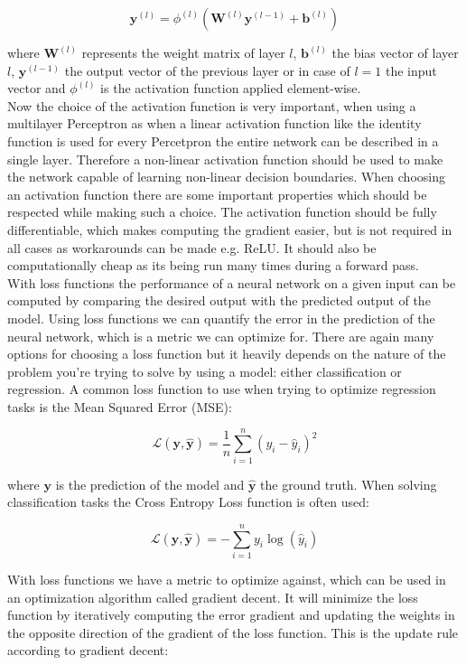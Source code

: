 \documentclass[twoside,a4paper,10pt,DIV=12,BCOR=12mm]{scrartcl}
\begin{document}
$$\mathbf{y}^{(l)} = \phi^{(l)}(\mathbf{W}^{(l)}\mathbf{y}^{(l-1)}+\mathbf{b}^{(l)})$$

where $\mathbf{W}^{(l)}$ represents the weight matrix of layer $l$, $\mathbf{b}^{(l)}$ the bias vector of layer $l$,
$\mathbf{y}^{(l-1)}$ the output vector of the previous layer or in case of $l=1$ the input vector
and $\phi^{(l)}$ is the activation function applied element-wise. \\


Now the choice of the activation function is very important, when using a multilayer Perceptron as when a linear activation function like the 
identity function is used for every Percetpron the entire network can be described in a single layer. Therefore
a non-linear activation function should be used to make the network capable of learning non-linear
decision boundaries. When choosing an activation function there are some important
properties which should be respected while making such a choice. The activation function should be fully differentiable, which makes
computing the gradient easier, but is not required in all cases as workarounds can be made e.g. ReLU. It should also be computationally
cheap as its being run many times during a forward pass. \\


With loss functions the performance of a neural network on a given input can be computed by comparing the desired output with the 
predicted output of the model. Using loss functions we can quantify the error in the prediction of the neural network, which 
is a metric we can optimize for. There are again many options for choosing a loss function but it heavily depends on the nature of the
problem you're trying to solve by using a model: either classification or regression. A common loss function to use when trying to optimize 
regression tasks is the Mean Squared Error (MSE):

$$\mathcal{L}(\mathbf{y},\mathbf{\hat{y}}) = \frac{1}{n}\sum^n_{i=1}{(y_i-\hat{y}_i)^2}$$

where $\mathbf{y}$ is the prediction of the model and $\mathbf{\hat{y}}$ the ground truth. When solving classification tasks the Cross Entropy Loss function is often used:


$$\mathcal{L}(\mathbf{y},\mathbf{\hat{y}}) = -\sum^n_{i=1}{y_i\log(\hat{y}_i)}$$

With loss functions we have a metric to optimize against, which can be used in an optimization algorithm called 
gradient decent. It will minimize the loss function by iteratively computing the error gradient and updating
the weights in the opposite direction of the gradient of the loss function. This is the update rule according
to gradient decent:
\end{document}
